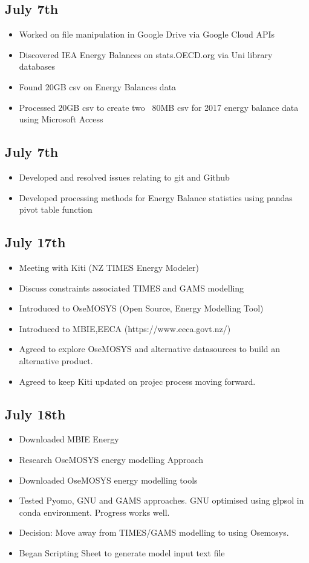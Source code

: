 \documentclass[12pt]{article}
\begin{document}
\subsection{July 7th}
\begin{itemize}
	\item Worked on file manipulation in Google Drive via Google Cloud APIs
	\item Discovered IEA Energy Balances on stats.OECD.org via Uni library databases
	\item Found 20GB csv on Energy Balances data
	\item Processed 20GB csv to create two ~80MB csv for 2017 energy balance data using Microsoft Access
\end{itemize}
\subsection{July 7th}
\begin{itemize}
	\item Developed and resolved issues relating to git and Github
	\item Developed processing methods for Energy Balance statistics using pandas pivot table function
\end{itemize}
\subsection{July 17th}
\begin{itemize}
	\item Meeting with Kiti (NZ TIMES Energy Modeler)
	\item Discuss constraints associated TIMES and GAMS modelling
	\item Introduced to OseMOSYS (Open Source, Energy Modelling Tool)
	\item Introduced to MBIE,EECA (https://www.eeca.govt.nz/)
	\item Agreed to explore OseMOSYS and alternative datasources to build an alternative product.
	\item Agreed to keep Kiti updated on projec process moving forward.
\end{itemize}
\subsection{July 18th}
\begin{itemize}
	\item Downloaded MBIE Energy 
	\item Research OseMOSYS energy modelling Approach
	\item Downloaded OseMOSYS energy modelling tools
	\item Tested Pyomo, GNU and GAMS approaches. GNU optimised using glpsol in conda environment. Progress works well.
	\item Decision: Move away from TIMES/GAMS modelling to using Osemosys.
	\item Began Scripting Sheet to generate model input text file
\end{itemize}
\end{document}
